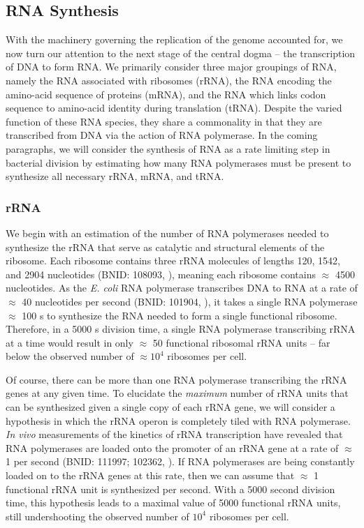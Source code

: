 \subsection{RNA Synthesis}
With the machinery governing the replication of the genome accounted for, we
now turn our attention to the next stage of the central dogma -- the
transcription of DNA to form RNA. We primarily consider three major groupings
of RNA, namely the RNA associated with ribosomes (rRNA), the RNA encoding the
amino-acid sequence of proteins (mRNA), and the RNA which links codon
sequence to amino-acid identity during translation (tRNA). Despite the varied
function of these RNA species, they share a commonality in that they are
transcribed from DNA via the action of RNA polymerase. In the coming
paragraphs, we will consider the synthesis of RNA as a rate limiting step in
bacterial division by estimating how many RNA polymerases must be present to
synthesize all necessary rRNA, mRNA, and tRNA.

\subsubsection{rRNA}
We begin with an estimation of the number of RNA polymerases needed to
synthesize the rRNA that serve as catalytic and structural elements of the
ribosome. Each ribosome contains three rRNA molecules of lengths 120, 1542,
and 2904 nucleotides (BNID: 108093, \cite{milo2010}), meaning each ribosome
contains $\approx$ 4500 nucleotides. As the \textit{E. coli} RNA polymerase
transcribes DNA to RNA at a rate of $\approx$ 40 nucleotides per second
(BNID: 101904, \cite{milo2010}), it takes a single RNA polymerase
$\approx$ 100 s to synthesize the RNA needed to form a single functional ribosome.
Therefore, in a 5000 s division time, a single RNA polymerase transcribing
rRNA at a time would result in only $\approx$ 50 functional ribosomal rRNA
units -- far below the observed number of $\approx 10^4$ ribosomes per cell.

Of course, there can be more than one RNA polymerase transcribing the rRNA genes
at any given time. To elucidate the \textit{maximum} number of rRNA units that can
be synthesized given a single copy of each rRNA gene, we will consider a
hypothesis in which the rRNA operon is completely tiled with RNA polymerase.
\textit{In vivo} measurements of the kinetics of rRNA transcription have revealed that
RNA polymerases are loaded onto the promoter of an rRNA gene at a rate of
$\approx$ 1 per second (BNID: 111997; 102362, \cite{milo2010}). If RNA
polymerases are being constantly loaded on to the rRNA genes at this rate,
then we can assume that $\approx$ 1 functional rRNA unit is
synthesized per second. With a 5000 second division time, this hypothesis
leads to a maximal value of 5000 functional rRNA units, still undershooting
the observed number of $10^4$ ribosomes per cell.

